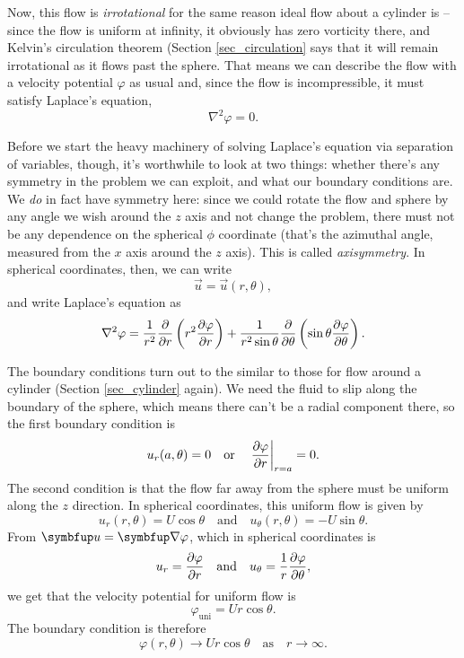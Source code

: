 Now, this flow is \emph{irrotational} for the same reason ideal flow about a cylinder is -- since the flow is uniform at infinity, it obviously has zero vorticity there, and Kelvin's circulation theorem (Section \ref{sec_circulation} says that it will remain irrotational as it flows past the sphere.  That means we can describe the flow with a velocity potential $\varphi$ as usual and, since the flow is incompressible, it must satisfy Laplace's equation,
\[
\nabla^2 \varphi = 0.
\]

Before we start the heavy machinery of solving Laplace's equation via separation of variables, though, it's worthwhile to look at two things:  whether there's any symmetry in the problem we can exploit, and what our boundary conditions are.  We \emph{do} in fact have symmetry here:  since we could rotate the flow and sphere by any angle we wish around the $z$ axis and not change the problem, there must not be any dependence on the spherical $\phi$ coordinate (that's the azimuthal angle, measured from the $x$ axis around the $z$ axis).  This is called \emph{axisymmetry}.  In spherical coordinates, then, we can write
\begin{equation}
\vec{u} = \vec{u}(r, \theta),
\end{equation}
and write Laplace's equation as
\begin{equation}
\label{eq_laplace_sph}
\nabla^2 \varphi = \frac{1}{r^2} \frac{\partial {}}{\partial {r}} \left( r^2 \frac{\partial {\varphi}}{\partial {r}} \right) + \frac{1}{r^2 \sin \theta} \frac{\partial {}}{\partial {\theta}} \left(\sin \theta \frac{\partial {\varphi}}{\partial {\theta}} \right).
\end{equation}

The boundary conditions turn out to the similar to those for flow around a cylinder (Section \ref{sec_cylinder} again).  We need the fluid to slip along the boundary of the sphere, which means there can't be a radial component there, so the first boundary condition is
\begin{equation}
\label{eq_sphere_bc1}
u_r(a, \theta) = 0 \quad \text{or} \quad \left. \frac{\partial {\varphi}}{\partial {r}} \right|_{r=a} = 0.
\end{equation}
The second condition is that the flow far away from the sphere must be uniform along the $z$ direction.  In spherical coordinates, this uniform flow is given by
\begin{equation}
\label{eq_sphere_uni}
u_r(r, \theta) = U\cos \theta \quad \text{and} \quad u_\theta(r, \theta) = -U \sin \theta.
\end{equation}
From $\vec{u} = \grad \varphi$, which in spherical coordinates is
\[
u_r = \frac{\partial {\varphi}}{\partial {r}} \quad \text{and} \quad u_\theta = \frac{1}{r} \frac{\partial {\varphi}}{\partial {\theta}},
\]
we get that the velocity potential for uniform flow is 
\[
\varphi_\text{uni} = U r \cos \theta.
\]
The boundary condition is therefore
\begin{equation}
\label{eq_sphere_bc2}
\varphi(r, \theta) \to Ur \cos \theta \quad \text{as} \quad r \to \infty.
\end{equation}

